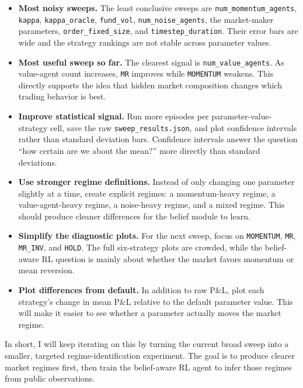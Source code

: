 \documentclass[11pt]{article}
\begin{document}
\begin{itemize}
    \item \textbf{Most noisy sweeps.} The least conclusive sweeps are
    \texttt{num\_momentum\_agents}, \texttt{kappa}, \texttt{kappa\_oracle},
    \texttt{fund\_vol}, \texttt{num\_noise\_agents}, the market-maker
    parameters, \texttt{order\_fixed\_size}, and \texttt{timestep\_duration}.
    Their error bars are wide and the strategy rankings are not stable across
    parameter values.

    \item \textbf{Most useful sweep so far.} The clearest signal is
    \texttt{num\_value\_agents}. As value-agent count increases,
    \texttt{MR} improves while \texttt{MOMENTUM} weakens. This directly
    supports the idea that hidden market composition changes which trading
    behavior is best.

    \item \textbf{Improve statistical signal.} Run more episodes per
    parameter-value-strategy cell, save the raw \texttt{sweep\_results.json},
    and plot confidence intervals rather than standard deviation bars.
    Confidence intervals answer the question ``how certain are we about the
    mean?'' more directly than standard deviations.

    \item \textbf{Use stronger regime definitions.} Instead of only changing
    one parameter slightly at a time, create explicit regimes: a
    momentum-heavy regime, a value-agent-heavy regime, a noise-heavy regime,
    and a mixed regime. This should produce cleaner differences for the belief
    module to learn.

    \item \textbf{Simplify the diagnostic plots.} For the next sweep, focus on
    \texttt{MOMENTUM}, \texttt{MR}, \texttt{MR\_INV}, and \texttt{HOLD}. The
    full six-strategy plots are crowded, while the belief-aware RL question is
    mainly about whether the market favors momentum or mean reversion.

    \item \textbf{Plot differences from default.} In addition to raw P\&L,
    plot each strategy's change in mean P\&L relative to the default parameter
    value. This will make it easier to see whether a parameter actually moves
    the market regime.
\end{itemize}

In short, I will keep iterating on this by turning the current broad sweep into
a smaller, targeted regime-identification experiment. The goal is to produce
clearer market regimes first, then train the belief-aware RL agent to infer
those regimes from public observations.
\end{document}
